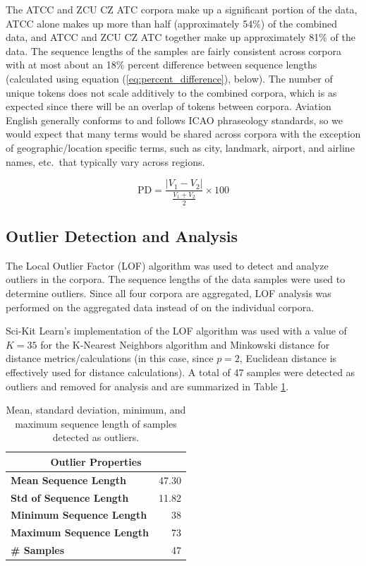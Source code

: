 \documentclass[12pt]{article}
\begin{document}
The ATCC and ZCU CZ ATC corpora make up a significant portion of the data, ATCC alone makes up more than half (approximately 54\%) of the combined
data, and ATCC and ZCU CZ ATC together make up approximately 81\% of the data. The sequence lengths of the samples are fairly consistent across
corpora with at most about an 18\% percent difference between sequence lengths (calculated using equation (\ref{eq:percent_difference}), below). The
number of unique tokens does not scale additively to the combined corpora, which is as expected since there will be an overlap of tokens between
corpora. Aviation English generally conforms to and follows ICAO phraseology standards, so we would expect that many terms would be
shared across corpora with the exception of geographic/location specific terms, such as city, landmark, airport, and airline names, etc.~that
typically vary across regions.

\begin{equation}\label{eq:percent_difference}
    \mbox{PD} = \frac{|V_1 - V_2|}{\frac{V_1 + V_2}{2}} \times 100
\end{equation}

\subsection{Outlier Detection and Analysis}\label{sec:outliers}
The Local Outlier Factor (LOF) algorithm \cite{breunig_lof_2000} was used to detect and analyze outliers in the corpora. The sequence lengths of the
data samples were used to determine outliers. Since all four corpora are aggregated, LOF analysis was performed on the aggregated data instead of on
the individual corpora.

Sci-Kit Learn's \cite{pedregosa_scikit-learn_2011} implementation of the LOF algorithm was used with a value of \(K = 35\) for the K-Nearest Neighbors
algorithm and Minkowski distance for distance metrics/calculations (in this case, since \(p=2\), Euclidean distance is effectively used for distance
calculations). A total of 47 samples were detected as outliers and removed for analysis and are summarized in Table \ref{tab:outlier_stats}.

\begin{table}[!t]
    \centering
    \begin{tabular}{l | r}
        \toprule
        \multicolumn{2}{c}{Outlier Properties}   \\
        \midrule
        \textbf{Mean Sequence Length}    & 47.30 \\
        \textbf{Std of Sequence Length}  & 11.82 \\
        \textbf{Minimum Sequence Length} & 38    \\
        \textbf{Maximum Sequence Length} & 73    \\
        \textbf{\# Samples}              & 47    \\
        \bottomrule
    \end{tabular}
    \caption{Mean, standard deviation, minimum, and maximum sequence length of samples detected as outliers.}
    \label{tab:outlier_stats}
\end{table}
\end{document}
